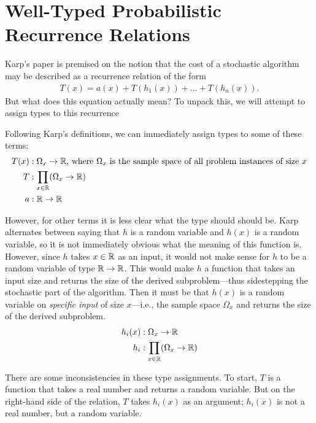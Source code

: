 \chapter{Well-Typed Probabilistic Recurrence Relations}
Karp's paper is premised on the notion that the cost of a stochastic algorithm may be described as a
recurrence relation of the form
\begin{align*}
T(x) = a(x) + T(h_1(x)) + \dots + T(h_n(x)).
\end{align*}
But what does this equation actually mean? To unpack this, we will attempt to assign types to this recurrence

 Following Karp's definitions, we can immediately assign types to some of these terms:
\begin{align*}
T(x) &: \Omega_x \rightarrow \mathbb{R} \text{, where } \Omega_x \text{ is the sample space of all problem instances of size } x \\
T &: \prod_{x \in \mathbb{R}} (\Omega_x \rightarrow \mathbb{R}) \\ 
a &: \mathbb{R} \rightarrow \mathbb{R}
\end{align*}

However, for other terms it is less clear what the type should should be. Karp alternates between saying that $h$ is a random 
variable and $h(x)$ is a random variable, so it is not immediately obvious 
what the meaning of this function is. However, since $h$ takes $x \in \mathbb{R}$ as an input, it would not make sense for $h$ to be a 
random variable of type $\mathbb{R} \rightarrow \mathbb{R}$. This would make $h$ a function that takes an input size and returns the 
size of the derived subproblem---thus sidestepping the stochastic part of the algorithm. Then it must be that $h(x)$ is a 
random variable on \emph{specific input} of size $x$---i.e., the sample space $\Omega_x$ and returns the size of the derived 
subproblem.
\begin{align*}
h_i(x) &: \Omega_x \rightarrow \mathbb{R} \\
h_i &: \prod_{x \in \mathbb{R}}(\Omega_x \rightarrow \mathbb{R}) 
\end{align*} 

There are some inconsistencies in these type assignments. To start, $T$ is a function that takes a real number and 
returns a random variable. But on the right-hand side of the relation, $T$ takes $h_i(x)$ as an argument; $h_i(x)$ is
not a real number, but a random variable. 

